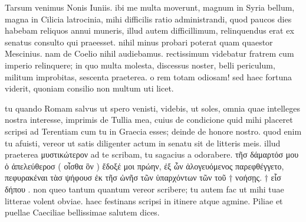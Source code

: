 


 Tarsum venimus Nonis Iuniis. ibi me multa moverunt, magnum in Syria bellum, magna in Cilicia latrocinia, mihi difficilis ratio administrandi, quod paucos dies habebam reliquos annui muneris, illud autem difficillimum, relinquendus erat ex senatus consulto qui praeesset. nihil minus probari poterat quam quaestor Mescinius. nam de Coelio nihil audiebamus. rectissimum videbatur fratrem cum imperio relinquere; in quo multa molesta, discessus noster, belli periculum, militum improbitas, sescenta praeterea. o rem totam odiosam! sed haec fortuna viderit, quoniam consilio non multum uti licet.

 tu quando Romam salvus ut spero venisti, videbis, ut soles, omnia quae intelleges nostra interesse, imprimis de Tullia mea, cuius de condicione quid mihi placeret scripsi ad Terentiam cum tu in Graecia esses; deinde de honore nostro. quod enim tu afuisti, vereor ut satis diligenter actum in senatu sit de litteris meis. illud praeterea μυστικώτερον ad te scribam, tu sagacius a odorabere. τῆσ δάμαρτόσ μου ὁ ἀπελεύθεροσ ( οἶσθα ὃν ) ἔδοξέ μοι πρώην, ἐξ ὧν ἀλογευόμενος παρεφθέγγετο, πεφυρακέναι τὰσ ψήφουσ ἐκ τῆσ ὠνῆσ τῶν ὑπαρχόντων τῶν τοῦ † νοήσῃς. † εἷσ δήπου . non queo tantum quantum vereor scribere; tu autem fac ut mihi tuae litterae volent obviae. haec festinans scripsi in itinere atque agmine. Piliae et puellae Caeciliae bellissimae salutem dices.
